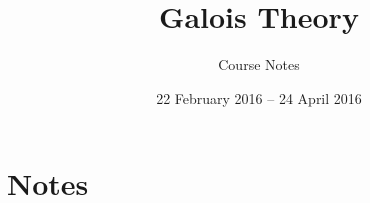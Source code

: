 \documentclass[11pt, reqno]{article}
\title{Galois Theory}
\author{Course Notes}
\date{22 February 2016 -- 24 April 2016}
\numberwithin{equation}{section}
\numberwithin{figure}{section}
\theoremstyle{plain}
\theoremstyle{definition}
\theoremstyle{remark}
\begin{document}
\maketitle

\tableofcontents
\newpage

\part{Notes}          %

%
%
%
%

%
%
%
\end{document}
